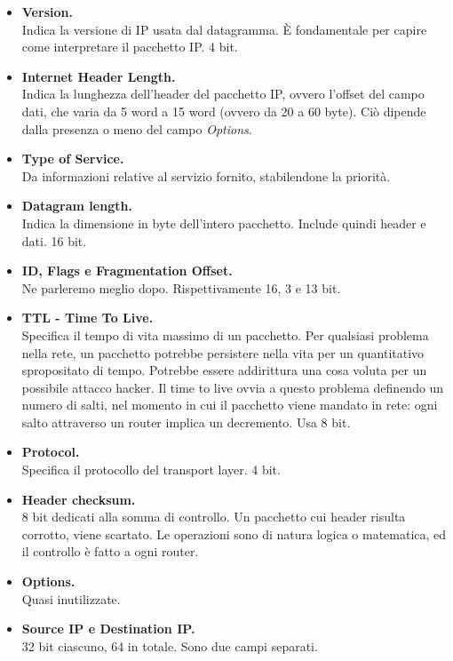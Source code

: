 \begin{itemize}
	\item \textbf{Version.}\\
	Indica la versione di IP usata dal datagramma. È fondamentale per capire come interpretare il pacchetto IP. 4 bit. 
	\item \textbf{Internet Header Length.}\\
	Indica la lunghezza dell'header del pacchetto IP, ovvero l'offset del campo dati, che varia da 5 word a 15 word (ovvero da 20 a 60 byte). Ciò dipende dalla presenza o meno del campo \textit{Options}.
	\item \textbf{Type of Service.}\\
	Da informazioni relative al servizio fornito, stabilendone la priorità.
	
	\item \textbf{Datagram length.}\\
	Indica la dimensione in byte dell'intero pacchetto. Include quindi header e dati. 16 bit.
	
	\item \textbf{ID, Flags e Fragmentation Offset.}\\
	Ne parleremo meglio dopo. Rispettivamente 16, 3 e 13 bit.
	
	\item \textbf{TTL - Time To Live.}\\
	Specifica il tempo di vita massimo di un pacchetto. Per qualsiasi problema nella rete, un pacchetto potrebbe persistere nella vita per un quantitativo spropositato di tempo. Potrebbe essere addirittura una cosa voluta per un possibile attacco hacker. Il time to live ovvia a questo problema definendo un numero di salti, nel momento in cui il pacchetto viene mandato in rete: ogni salto attraverso un router implica un decremento. Usa 8 bit.
	
	\item \textbf{Protocol.}\\
	Specifica il protocollo del transport layer. 4 bit.
	
	\item \textbf{Header checksum.}\\
	8 bit dedicati alla somma di controllo. Un pacchetto cui header risulta corrotto, viene scartato. Le operazioni sono di natura logica o matematica, ed il controllo è fatto a ogni router.
	
	\item \textbf{Options.}\\
	Quasi inutilizzate.
	
	\item \textbf{Source IP e Destination IP.}\\
	32 bit ciascuno, 64 in totale. Sono due campi separati.
\end{itemize}

